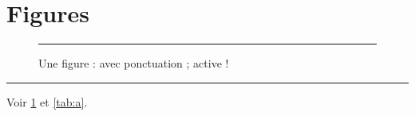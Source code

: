 \documentclass{article}
\begin{document}
\listoffigures
\section{Figures}
\begin{figure}[htbp]
\centering\rule{3cm}{1cm}
\caption{Une figure : avec ponctuation ; active !}\label{fig:a}
\end{figure}
\begin{table}[htbp]
\caption{Un tableau}\label{tab:a}
\centering\rule{3cm}{1cm}
\end{table}
Voir \ref{fig:a} et \ref{tab:a}.
\end{document}
